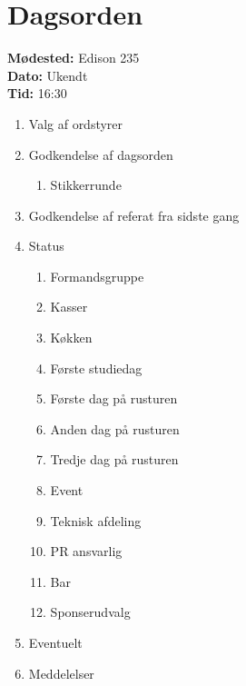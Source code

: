 

\newcommand{\meeting}{Stormøde 1}
\newcommand{\dato}{Ukendt}
\newcommand{\tid}{16:30}
\newcommand{\location}{Edison 235}



\section*{Dagsorden}%
\textbf{Mødested:} \location{}\\
\textbf{Dato:} \dato{}\\
\textbf{Tid:} \tid{}

\begin{enumerate}
  \item Valg af ordstyrer
  \item Godkendelse af dagsorden
  \begin{enumerate}
    \item Stikkerrunde
  \end{enumerate}
  \item Godkendelse af referat fra sidste gang
  \item Status
  \begin{enumerate}
    \item Formandsgruppe
    \item Kasser
    \item Køkken
    \item Første studiedag
    \item Første dag på rusturen
    \item Anden dag på rusturen
    \item Tredje dag på rusturen
    \item Event
    \item Teknisk afdeling
    \item PR ansvarlig
    \item Bar
    \item Sponserudvalg
  \end{enumerate}
  \item Eventuelt
  \item Meddelelser
\end{enumerate}




